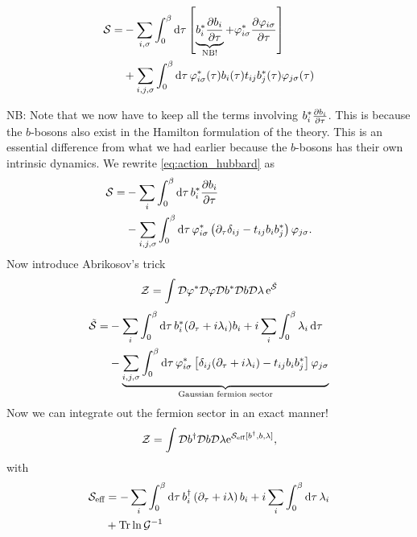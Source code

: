 \begin{align}
\label{eq:action_hubbard}
\begin{split}
\mathcal{S} = &-\sum_{i,\sigma}\int_0^\beta \dd{\tau}\left[\underbrace{b_i^*\pdv{b_i}{\tau}}_{\text{NB!}} + \varphi_{i\sigma}^*\pdv{\varphi_{i\sigma}}{\tau} \right] \\
&+ \sum_{i,j,\sigma}\int_0^\beta\dd{\tau}\varphi_{i\sigma}^*(\tau)b_i(\tau)t_{ij}b_j^*(\tau)\varphi_{j\sigma}(\tau)
\end{split}
\end{align}

NB: Note that we now have to keep all the terms involving $b_i^*\pdv{b_i}{\tau}$. This is because the $b$-bosons also exist in the Hamilton formulation of the theory. This is an essential difference from what we had earlier because the $b$-bosons has their own intrinsic dynamics.
We rewrite \eqref{eq:action_hubbard} as
\begin{align}
\begin{split}
\mathcal{S} = &-\sum_i\int_0^\beta\dd{\tau}b_i^*\pdv{b_i}{\tau} \\
&-\sum_{i,j,\sigma}\int_0^\beta\dd{\tau} \varphi_{i\sigma}^*\left(\partial_\tau\delta_{ij} - t_{ij}b_ib_j^*\right)\varphi_{j\sigma}.
\end{split}
\end{align} 
Now introduce Abrikosov's trick
\begin{equation}
\mathcal{Z}  = \int \mathcal{D}\varphi^*\mathcal{D}\varphi\mathcal{D} b^*\mathcal{D} b \mathcal{D} \lambda\, \mathrm{e}^{\tilde{\mathcal{S}}}
\end{equation}
\begin{align*}
\tilde{\mathcal{S}} = &-\sum_i\int_0^\beta\dd{\tau}b_i^*(\partial_\tau + i\lambda_i)b_i + i\sum_i\int_0^\beta\lambda_i\dd{\tau} \\
&-\underbrace{\sum_{i,j,\sigma}\int_0^\beta\dd{\tau}\varphi_{i\sigma}^*\left[\delta_{ij}(\partial_\tau + i\lambda_i) - t_{ij}b_ib_j^*\right]\varphi_{j\sigma}}_{\text{Gaussian fermion sector}}
\end{align*}
Now we can integrate out the fermion sector in an exact manner!
\begin{equation}
\mathcal{Z} = \int\mathcal{D} b^\dagger\mathcal{D} b\mathcal{D}\lambda \mathrm{e}^{\mathcal{S}_{\text{eff}}[b^\dagger, b, \lambda]},
\end{equation}
with
\begin{align}
\begin{split}
\mathcal{S}_{\text{eff}} &= -\sum_i\int_0^\beta\dd{\tau}b_i^\dagger\left(\partial_\tau + i\lambda\right)b_i + i\sum_i\int_0^\beta\dd{\tau}\lambda_i \\
&+ \Tr\ln\mathcal{G}^{-1}
\end{split}
\end{align}

